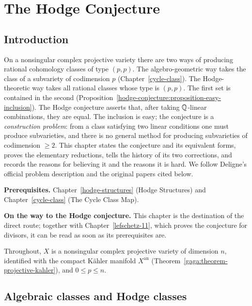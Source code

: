 \chapter{The Hodge Conjecture}\label{hodge-conjecture}

\section{Introduction}\label{hodge-conjecture:section-introduction}

On a nonsingular complex projective variety there are two ways of producing rational cohomology classes of type $(p,p)$. The algebro-geometric way takes
the class of a subvariety of codimension $p$ (Chapter~\ref{cycle-class}). The Hodge-theoretic way takes all rational classes whose type is $(p,p)$. The first
set is contained in the second (Proposition~\ref{hodge-conjecture:proposition-easy-inclusion}). The Hodge conjecture asserts that, after taking $\mathbb{Q}$-linear
combinations, they are equal. The inclusion is easy; the conjecture is a \emph{construction problem}: from a class satisfying two linear conditions one must produce
subvarieties, and there is no general method for producing subvarieties of codimension $\geq 2$. This chapter states the conjecture and its equivalent forms, proves the
elementary reductions, tells the history of its two corrections, and records the reasons for believing it and the reasons it is hard. We follow Deligne's official
problem description \cite{deligne-clay} and the original papers cited below.

\noindent\textbf{Prerequisites.} Chapter~\ref{hodge-structures} (Hodge Structures) and Chapter~\ref{cycle-class} (The Cycle Class Map).

\noindent\textbf{On the way to the Hodge conjecture.} This chapter is the destination of the direct route; together with Chapter~\ref{lefschetz-11}, which proves the conjecture for divisors, it can be read
as soon as its prerequisites are.

Throughout, $X$ is a nonsingular complex projective variety of dimension $n$, identified with the compact K\"ahler manifold $X^{\mathrm{an}}$ (Theorem~\ref{gaga:theorem-projective-kahler}),
and $0 \leq p \leq n$.

\section{Algebraic classes and Hodge classes}\label{hodge-conjecture:section-classes}

